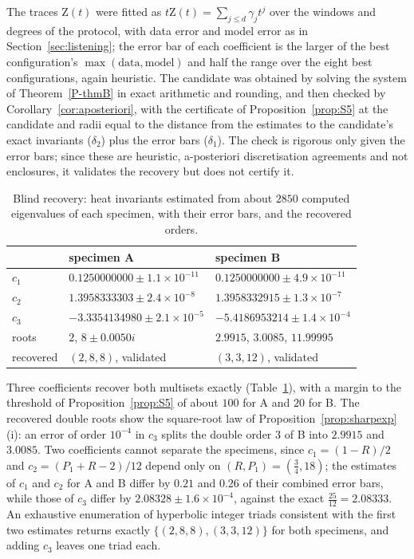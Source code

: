 \documentclass[pdflatex,sn-mathphys-num]{sn-jnl}
\newcommand{\cZ}{\mathrm{Z}}
\newcommand{\pref}[1]{\ref*{P-#1}}%
\theoremstyle{thmstyleone}%
\theoremstyle{thmstylethree}%
\providecommand{\cZ}{\mathrm{Z}}
\begin{document}
The traces $\cZ(t)$ were fitted as $t\cZ(t)=\sum_{j\le d}\gamma_jt^j$ over the windows and degrees of the protocol, with data error and model error as in Section~\ref{sec:listening}; the error bar of each coefficient is the larger of the best configuration's $\max(\text{data},\text{model})$ and half the range over the eight best configurations, again heuristic. The candidate was obtained by solving the system of Theorem~\pref{thmB} in exact arithmetic and rounding, and then checked by Corollary~\ref{cor:aposteriori}, with the certificate of Proposition~\ref{prop:S5} at the candidate and radii equal to the distance from the estimates to the candidate's exact invariants ($\delta_2$) plus the error bars ($\delta_1$). The check is rigorous only given the error bars; since these are heuristic, a-posteriori discretisation agreements and not enclosures, it validates the recovery but does not certify it.

\begin{table}[ht]
\caption{Blind recovery: heat invariants estimated from about $2850$ computed eigenvalues of each specimen, with their error bars, and the recovered orders.}\label{tab:blind}
\centering\small
\begin{tabular}{@{}lll@{}}
\toprule
 & specimen A & specimen B\\
\midrule
$c_1$ & $0.1250000000\pm1.1\times10^{-11}$ & $0.1250000000\pm4.9\times10^{-11}$\\
$c_2$ & $1.3958333303\pm2.4\times10^{-8}$ & $1.3958332915\pm1.3\times10^{-7}$\\
$c_3$ & $-3.3354134980\pm2.1\times10^{-5}$ & $-5.4186953214\pm1.4\times10^{-4}$\\
roots & $2$, $8\pm0.0050i$ & $2.9915$, $3.0085$, $11.99995$\\
recovered & $(2,8,8)$, validated & $(3,3,12)$, validated\\
\bottomrule
\end{tabular}
\end{table}

Three coefficients recover both multisets exactly (Table~\ref{tab:blind}), with a margin to the threshold of Proposition~\ref{prop:S5} of about $100$ for A and $20$ for B. The recovered double roots show the square-root law of Proposition~\ref{prop:sharpexp}(i): an error of order $10^{-4}$ in $c_3$ splits the double order $3$ of B into $2.9915$ and $3.0085$. Two coefficients cannot separate the specimens, since $c_1=(1-R)/2$ and $c_2=(P_1+R-2)/12$ depend only on $(R,P_1)=(\frac34,18)$; the estimates of $c_1$ and $c_2$ for A and B differ by $0.21$ and $0.26$ of their combined error bars, while those of $c_3$ differ by $2.08328\pm1.6\times10^{-4}$, against the exact $\frac{25}{12}=2.08333$. An exhaustive enumeration of hyperbolic integer triads consistent with the first two estimates returns exactly $\{(2,8,8),(3,3,12)\}$ for both specimens, and adding $c_3$ leaves one triad each.
\end{document}
